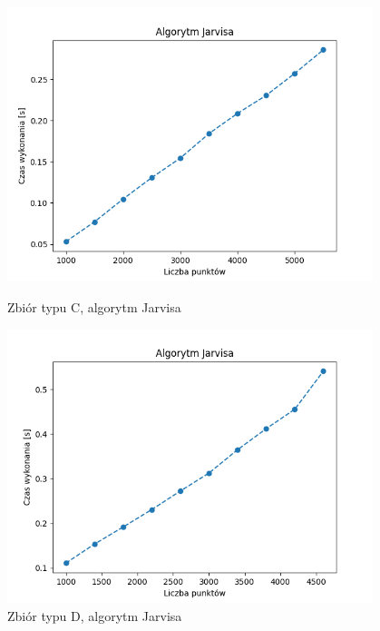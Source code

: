 \documentclass[11pt]{article}
\theoremstyle{remark} \newtheorem{definition}{def.}
\theoremstyle{definition} \newtheorem{twierdzenie}{tw.}
\begin{document}
\begin{figure}[]
    \centering
    \begin{minipage}{0.48\textwidth}
        \centering
        \includegraphics[width=0.95\textwidth]{../tests/prost-jarvis.png} %
        \caption{Zbiór typu C, algorytm Jarvisa}
        \label{fig:prost-jarvis}
    \end{minipage}\hfill
    \begin{minipage}{0.48\textwidth}
        \centering
        \includegraphics[width=0.95\textwidth]{../tests/kw-jarvis.png} %
        \caption{Zbiór typu D, algorytm Jarvisa}
        \label{fig:kw-jarvis}
    \end{minipage}
\end{figure}
\end{document}
